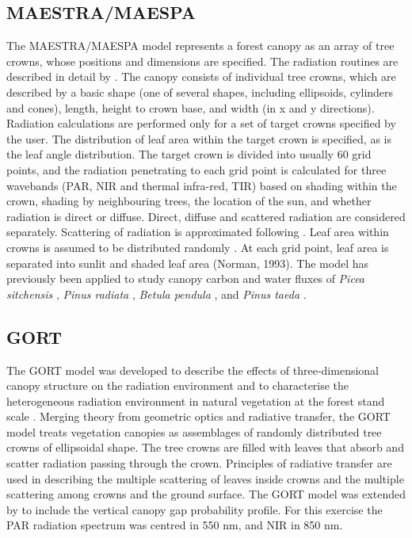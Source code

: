 \documentclass[a4paper,11pt]{report}
\begin{document}
\subsection{MAESTRA/MAESPA}\label{section:maespa}
The MAESTRA/MAESPA model \citep{Wang1990,Medlyn2004,Medlyn2007,Duursma2012} represents a forest canopy as an array of tree crowns, whose positions and dimensions are specified. The radiation routines are described in detail by \citet{Wang1990}. The canopy consists of individual tree crowns, which are described by a basic shape (one of several shapes, including ellipsoids, cylinders and cones), length, height to crown base, and width (in x and y directions). Radiation calculations are performed only for a set of target crowns specified by the user. The distribution of leaf area within the target crown is specified, as is the leaf angle distribution. The target crown is divided into usually 60 grid points, and the radiation penetrating to each grid point is calculated for three wavebands (PAR, NIR and thermal infra-red, TIR) based on shading within the crown, shading by neighbouring trees, the location of the sun, and whether radiation is direct or diffuse. Direct, diffuse and scattered radiation are considered separately. Scattering of radiation is approximated following \citet{Norman1979}. Leaf area within crowns is assumed to be distributed randomly \citep{Wang1990}. At each grid point, leaf area is separated into sunlit and shaded leaf area (Norman, 1993). The model has previously been applied to study canopy carbon and water fluxes of \textit{Picea sitchensis} \citep{Wang1990}, \textit{Pinus radiata} \citep{McMurtrie1993}, \textit{Betula pendula} \citep{Wang1998}, and \textit{Pinus taeda} \citep{Luo2001}. 

\subsection{GORT} 
The GORT model was developed to describe the effects of three-dimensional canopy structure on the radiation environment and to characterise the heterogeneous radiation environment in natural vegetation at the forest stand scale \citep{Li1995}. Merging theory from geometric optics and radiative transfer, the GORT model treats vegetation canopies as assemblages of randomly distributed tree crowns of ellipsoidal shape. The tree crowns are filled with leaves that absorb and scatter radiation passing through the crown. Principles of radiative transfer are used in describing the multiple scattering of leaves inside crowns and the multiple scattering among crowns and the ground surface. The GORT model was extended by \citet{Ni1997} to include the vertical canopy gap probability profile. For this exercise the PAR radiation spectrum was centred in 550 nm, and NIR in 850 nm.
\end{document}
